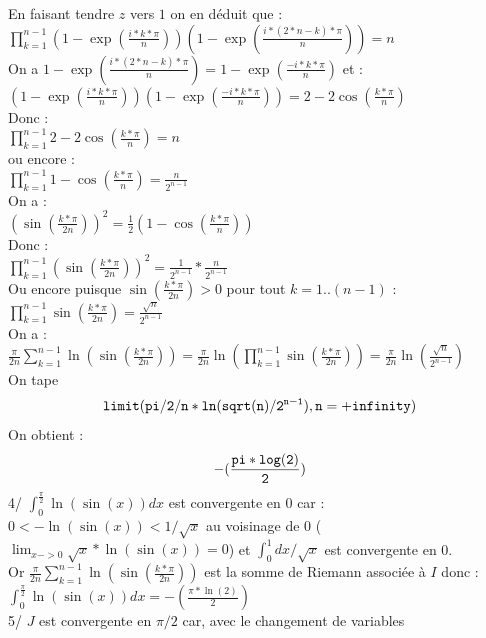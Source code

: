 \documentclass[a4paper,11pt]{book}
\begin{document}
En faisant tendre $z$ vers $1$ on en d\'eduit que :\\
$\displaystyle \prod_{k=1}^{n-1}(1-\exp(\frac{i*k*\pi}{n}))(1-\exp(\frac{i*(2*n-k)*\pi}{n}))=n$\\
On a $\displaystyle 1-\exp(\frac{i*(2*n-k)*\pi}{n})=1-\exp(\frac{-i*k*\pi}{n})$ et :\\
$\displaystyle(1-\exp(\frac{i*k*\pi}{n}))(1-\exp(\frac{-i*k*\pi}{n}))=2-2\cos(\frac{k*\pi}{n})$\\
Donc :\\
$\displaystyle \prod_{k=1}^{n-1}2-2\cos(\frac{k*\pi}{n})=n$\\
ou encore :\\
$\displaystyle \prod_{k=1}^{n-1}1-\cos(\frac{k*\pi}{n})=\frac{n}{2^{n-1}}$\\
On a :\\
$\displaystyle (\sin(\frac{k*\pi}{2n}))^2=\frac{1}{2}(1-\cos(\frac{k*\pi}{n}))$\\
Donc :\\
$\displaystyle \prod_{k=1}^{n-1}(\sin(\frac{k*\pi}{2n}))^2=\frac{1}{2^{n-1}}*\frac{n}{2^{n-1}}$\\
Ou encore puisque $\sin(\frac{k*\pi}{2n})>0$ pour tout $k=1..(n-1)$ :\\
$\displaystyle \prod_{k=1}^{n-1}\sin(\frac{k*\pi}{2n})=\frac{\sqrt n}{2^{n-1}}$\\
On a :\\
$\displaystyle \frac{\pi}{2n}\sum_{k=1}^{n-1} \ln(\sin(\frac{k*\pi}{2n}))=
\frac{\pi}{2n}\ln(\prod_{k=1}^{n-1}\sin(\frac{k*\pi}{2n}))=
\frac{\pi}{2n}\ln(\frac{\sqrt n}{2^{n-1}})$\\
On tape
$${\tt limit(pi/2/n*ln(sqrt(n)/2^{n-1}),n=+infinity)}$$
On obtient :
$${\tt -(\frac{pi*log(2)}{2})}$$
4/ $\int_0^{\frac{\pi}{2}}\ln(\sin(x))dx$ est convergente en 0 car :\\
$0<-\ln(\sin(x))<1/\sqrt x$ au voisinage de 0 ($\lim_{x->0}\sqrt x *\ln(\sin(x))=0$)  et $\int_0^1 dx/\sqrt x $ est convergente en 0.\\ 
Or $\displaystyle \frac{\pi}{2n}\sum_{k=1}^{n-1} \ln(\sin(\frac{k*\pi}{2n}))$
est la somme de Riemann associ\'ee \`a $I$
donc :\\
$\displaystyle \int_0^{\frac{\pi}{2}}\ln(\sin(x))dx=-(\frac{\pi*\ln(2)}{2})$\\ 
5/ $J$ est convergente en $\pi/2$ car, avec le changement de variables 
\end{document}
